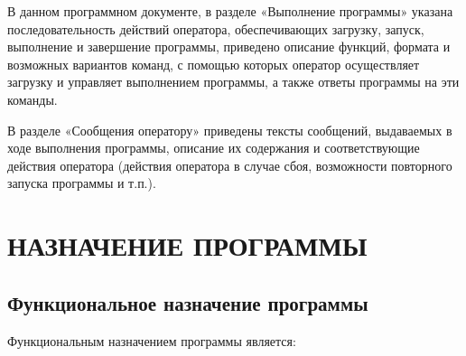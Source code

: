 \documentclass[14pt,a4paper,final]{extreport}
\begin{document}
В данном программном документе, в разделе «Выполнение программы» указана последовательность действий оператора, обеспечивающих загрузку, запуск, выполнение и завершение программы, приведено описание функций, формата и возможных вариантов команд, с помощью которых оператор осуществляет загрузку и управляет выполнением программы, а также ответы программы на эти команды.

В разделе «Сообщения оператору» приведены тексты сообщений, выдаваемых в ходе выполнения программы, описание их содержания и соответствующие действия оператора (действия оператора в случае сбоя, возможности повторного запуска программы и т.п.).

\pagebreak


\tableofcontents
\pagebreak

\chapter{ НАЗНАЧЕНИЕ ПРОГРАММЫ}
\section{ Функциональное назначение программы}
Функциональным назначением программы является: 
\end{document}
